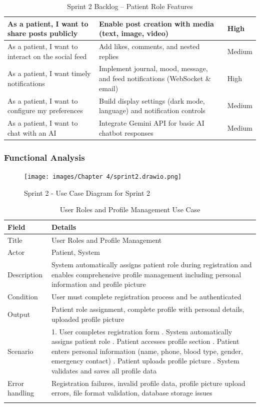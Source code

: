 \begin{table}[H]
\begin{tabular}{|p{4.2cm}|p{7.2cm}|p{2.2cm}|}
As a patient, I want to share posts publicly & Enable post creation with media (text, image, video) & High \\
\hline
As a patient, I want to interact on the social feed & Add likes, comments, and nested replies & Medium \\
\hline
As a patient, I want timely notifications & Implement journal, mood, message, and feed notifications (WebSocket \& email) & High \\
\hline
As a patient, I want to configure my preferences & Build display settings (dark mode, language) and notification controls & Medium \\
\hline
As a patient, I want to chat with an AI & Integrate Gemini API for basic AI chatbot responses & Medium \\
\hline
\end{tabular}
\caption{Sprint 2 Backlog -- Patient Role Features}
\end{table}


\subsubsection{Functional Analysis}
\begin{figure}[H]
    \centering
    \texttt{[image: images/Chapter 4/sprint2.drawio.png]}
    \caption{Sprint 2 - Use Case Diagram for Sprint 2}
    \label{fig:use_case_patient}
\end{figure}

\begin{longtable}{|p{3cm}|p{12cm}|}
\hline
\textbf{Field} & \textbf{Details} \\
\hline
Title & User Roles and Profile Management \\
\hline
Actor & Patient, System \\
\hline
Description & System automatically assigns patient role during registration and enables comprehensive profile management including personal information and profile picture \\
\hline
Condition & User must complete registration process and be authenticated \\
\hline
Output & Patient role assignment, complete profile with personal details, uploaded profile picture \\
\hline
Scenario & 1. User completes registration form \newline 2. System automatically assigns patient role \newline 3. Patient accesses profile section \newline 4. Patient enters personal information (name, phone, blood type, gender, emergency contact) \newline 5. Patient uploads profile picture \newline 6. System validates and saves all profile data \\
\hline
Error handling & Registration failures, invalid profile data, profile picture upload errors, file format validation, database storage issues \\
\hline
\caption{User Roles and Profile Management Use Case}
\end{longtable}

